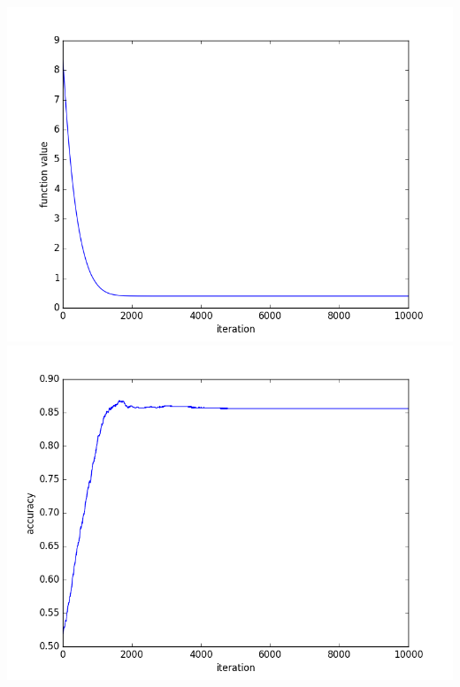 \documentclass{article}
\begin{document}
\begin{center}
    \includegraphics[totalheight=0.5\textheight]{./q3-2-fv.png}
    \includegraphics[totalheight=0.5\textheight]{./q3-2-ac.png}
\end{center}
\end{document}
